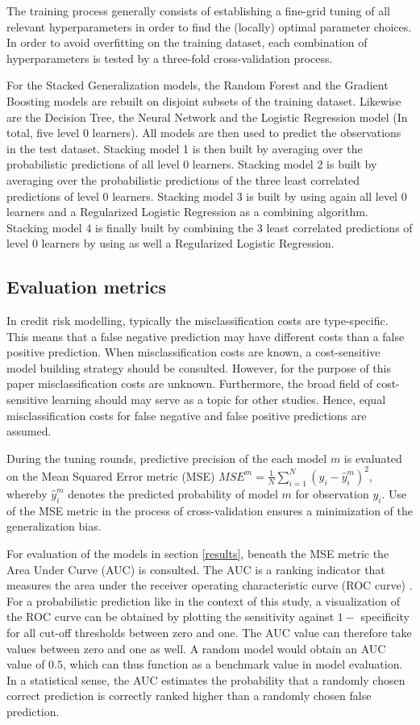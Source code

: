 \documentclass[12pt]{article}
\begin{document}
The training process generally consists of establishing a fine-grid tuning of all relevant hyperparameters in order to find the (locally) optimal parameter choices. In order to avoid overfitting on the training dataset, each combination of hyperparameters is tested by a three-fold cross-validation process.

For the Stacked Generalization models, the Random Forest and the Gradient Boosting models are rebuilt on disjoint subsets of the training dataset. Likewise are the Decision Tree, the Neural Network and the Logistic Regression model (In total, five level 0 learners). All models are then used to predict the observations in the test dataset. Stacking model 1 is then built by averaging over the probabilistic predictions of all level 0 learners. Stacking model 2 is built by averaging over the probabilistic predictions of the three least correlated predictions of level 0 learners. Stacking model 3 is built by using again all level 0 learners and a Regularized Logistic Regression as a combining algorithm. Stacking model 4 is finally built by combining the 3 least correlated predictions of level 0 learners by using as well a Regularized Logistic Regression.

\subsection{Evaluation metrics}
In credit risk modelling, typically the misclassification costs are type-specific. This means that a false negative prediction may have different costs than a false positive prediction. When misclassification costs are known, a cost-sensitive model building strategy should be consulted. However, for the purpose of this paper misclassification costs are unknown. Furthermore, the broad field of cost-sensitive learning should may serve as a topic for other studies. Hence, equal misclassification costs for false negative and false positive predictions are assumed.

During the tuning rounds, predictive precision of the each model $m$ is evaluated on the Mean Squared Error metric (MSE) $MSE^m = \frac{1}{N}\sum_{i=1}^{N}(y_i - \hat{y}^m_i)^2$, whereby $\hat{y}^m_i$ denotes the predicted probability of model $m$ for observation $y_i$. Use of the MSE metric in the process of cross-validation ensures a minimization of the generalization bias. 

For evaluation of the models in section \ref{results}, beneath the MSE metric the Area Under Curve (AUC) is consulted. The AUC is a ranking indicator that measures the area under the receiver operating characteristic curve (ROC curve) \citep{hanley1982meaning}. For a probabilistic prediction like in the context of this study, a visualization of the ROC curve can be obtained by plotting the sensitivity against $1 -$ specificity for all cut-off thresholds between zero and one. The AUC value can therefore take values between zero and one as well. A random model would obtain an AUC value of $0.5$, which can thus function as a benchmark value in model evaluation. In a statistical sense, the AUC estimates the probability that a randomly chosen correct prediction is correctly ranked higher than a randomly chosen false prediction. 
\end{document}
